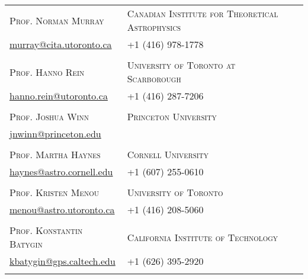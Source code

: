 \documentclass[10pt]{article} %
\begin{document}
\begin{tabular}{l|ll}
\textsc{Prof. Norman Murray} & \textsc{Canadian Institute for Theoretical Astrophysics} \\
\href{mailto:murray@cita.utoronto.ca}{murray@cita.utoronto.ca} & +1 (416) 978-1778 \\
\\

\textsc{Prof. Hanno Rein} &  \textsc{University of Toronto at Scarborough} \\
\href{hanno.rein@utoronto.ca}{hanno.rein@utoronto.ca} & +1 (416) 287-7206 \\
\\

\textsc{Prof. Joshua Winn} &  \textsc{Princeton University} \\
\href{mailto:jnwinn@princeton.edu}{jnwinn@princeton.edu} \\
\\

\textsc{Prof. Martha Haynes} & \textsc{Cornell University} \\
\href{mailto:haynes@astro.cornell.edu}{haynes@astro.cornell.edu} & +1 (607) 255-0610 \\
\\

\textsc{Prof. Kristen Menou} &  \textsc{University of Toronto} \\
\href{mailto:menou@astro.utoronto.ca}{menou@astro.utoronto.ca} & +1 (416) 208-5060 \\
\\

\textsc{Prof. Konstantin Batygin} &  \textsc{California Institute of Technology} \\
\href{mailto:kbatygin@gps.caltech.edu}{kbatygin@gps.caltech.edu} & +1 (626) 395-2920 \\
\\

\end{tabular}
\end{document}
